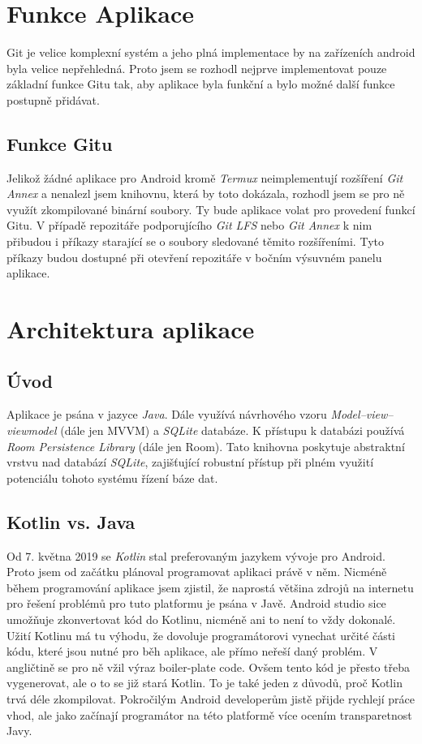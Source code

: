     \section{Funkce Aplikace}
        Git je velice komplexní systém a jeho plná implementace by na zařízeních android byla velice nepřehledná. Proto jsem se rozhodl nejprve implementovat pouze základní funkce Gitu tak, aby aplikace byla funkční a bylo možné další funkce postupně přidávat.

        \subsection{Funkce Gitu}
        Jelikož žádné aplikace pro Android kromě \emph{Termux} neimplementují rozšíření \emph{Git Annex} a nenalezl jsem knihovnu, která by toto dokázala, rozhodl jsem se pro ně využít zkompilované binární soubory. Ty bude aplikace volat pro provedení funkcí Gitu.
        V případě repozitáře podporujícího \emph{Git LFS} nebo \emph{Git Annex} k nim přibudou i příkazy starající se o soubory sledované těmito rozšířeními. Tyto příkazy budou dostupné při otevření repozitáře v bočním výsuvném panelu aplikace.

    \section{Architektura aplikace}

        \subsection{Úvod}
        Aplikace je psána v jazyce \emph{Java}. Dále využívá návrhového vzoru \emph{Model–view–viewmodel} (dále jen MVVM) a \emph{SQLite} databáze. K přístupu k databázi používá \emph{Room Persistence Library} (dále jen Room). Tato knihovna poskytuje abstraktní vrstvu nad databází \emph{SQLite}, zajišťující robustní přístup při plném využití potenciálu tohoto systému řízení báze dat.

        \subsection{Kotlin vs. Java}
        Od 7. května 2019 se \emph{Kotlin} stal preferovaným jazykem vývoje pro Android. Proto jsem od začátku plánoval programovat aplikaci právě v něm. Nicméně během programování aplikace jsem zjistil, že naprostá většina zdrojů na internetu pro řešení problémů pro tuto platformu je psána v Javě. Android studio sice umožňuje zkonvertovat kód do Kotlinu, nicméně ani to není to vždy dokonalé. Užití Kotlinu má tu výhodu, že dovoluje programátorovi vynechat určité části kódu, které jsou nutné pro běh aplikace, ale přímo neřeší daný problém. V angličtině se pro ně vžil výraz boiler-plate code. Ovšem tento kód je přesto třeba vygenerovat, ale o to se již stará Kotlin. To je také jeden z důvodů, proč Kotlin trvá déle zkompilovat. Pokročilým Android developerům jistě přijde rychlejí práce vhod, ale jako začínají programátor na této platformě více ocením transparetnost Javy.    

